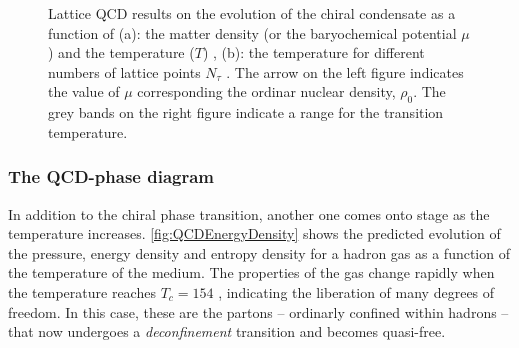 \begin{figure}[t]
	\caption{Lattice QCD results on the evolution of the chiral condensate as a function of (a): the matter density (or the baryochemical potential $\mu$) and the temperature ($T$) \cite{muroyaLatticeQCDFinite2003}, (b): the temperature for different numbers of lattice points $N_{\tau}$ \cite{weiseChiralSymmetryStrongly2010}. The arrow on the left figure indicates the value of $\mu$ corresponding the ordinar nuclear density, $\rho_0$. The grey bands on the right figure indicate a range for the transition temperature.}
	\label{fig:ChiralTransition}
\end{figure}

\subsubsection{The QCD-phase diagram}
\label{subsubsec:QCDphasediagram}

In addition to the chiral phase transition, another one comes onto stage as the temperature increases. \Fig\ref{fig:QCDEnergyDensity} shows the predicted evolution of the pressure, energy density and entropy density for a hadron gas as a function of the temperature of the medium. The properties of the gas change rapidly when the temperature reaches $T_{c} = 154$ \mev, indicating the liberation of many degrees of freedom. In this case, these are the partons -- ordinarly confined within hadrons -- that now undergoes a \textit{deconfinement} transition and becomes quasi-free. 

